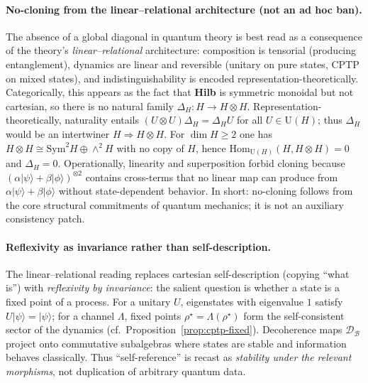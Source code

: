 \documentclass[11pt]{article}
\theoremstyle{upright}
\begin{document}
\paragraph{No-cloning from the linear--relational architecture (not an ad hoc ban).}
The absence of a global diagonal in quantum theory is best read as a consequence of the theory's \emph{linear--relational} architecture: composition is tensorial (producing entanglement), dynamics are linear and reversible (unitary on pure states, CPTP on mixed states), and indistinguishability is encoded representation-theoretically. Categorically, this appears as the fact that \textbf{Hilb} is symmetric monoidal but not cartesian, so there is no natural family $\Delta_H:H\!\to\!H\otimes H$. Representation-theoretically, naturality entails $(U\!\otimes\!U)\Delta_H=\Delta_HU$ for all $U\in\mathrm{U}(H)$; thus $\Delta_H$ would be an intertwiner $H\!\Rightarrow\!H\otimes H$. For $\dim H\ge 2$ one has $H\otimes H\cong \mathrm{Sym}^2H\oplus\wedge^2 H$ with no copy of $H$, hence $\mathrm{Hom}_{\mathrm{U}(H)}(H,H\otimes H)=0$ and $\Delta_H=0$. Operationally, linearity and superposition forbid cloning because $(\alpha|\psi\rangle+\beta|\phi\rangle)^{\otimes 2}$ contains cross-terms that no linear map can produce from $\alpha|\psi\rangle+\beta|\phi\rangle$ without state-dependent behavior. In short: no-cloning follows from the core structural commitments of quantum mechanics; it is not an auxiliary consistency patch.

\paragraph{Reflexivity as invariance rather than self-description.}
The linear--relational reading replaces cartesian self-description (copying ``what is'') with \emph{reflexivity by invariance}: the salient question is whether a state is a fixed point of a process. For a unitary $U$, eigenstates with eigenvalue $1$ satisfy $U|\psi\rangle=|\psi\rangle$; for a channel $\Lambda$, fixed points $\rho^\star=\Lambda(\rho^\star)$ form the self-consistent sector of the dynamics (cf.\ Proposition~\ref{prop:cptp-fixed}). Decoherence maps $\mathcal{D}_{\mathcal{B}}$ project onto commutative subalgebras where states are stable and information behaves classically. Thus ``self-reference'' is recast as \emph{stability under the relevant morphisms}, not duplication of arbitrary quantum data.
\end{document}

